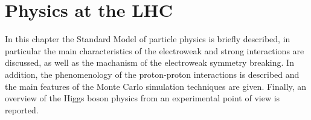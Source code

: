 \chapter{Physics at the LHC}\label{chap1}
\thispagestyle{empty}

In this chapter the Standard Model of particle physics is briefly described, in particular the main characteristics of the electroweak and strong interactions are discussed, as well as the machanism of the electroweak symmetry breaking.
In addition, the phenomenology of the proton-proton interactions is described and the main features of the Monte Carlo simulation techniques are given.
Finally, an overview of the Higgs boson physics from an experimental point of view is reported.


%
%


%
%


